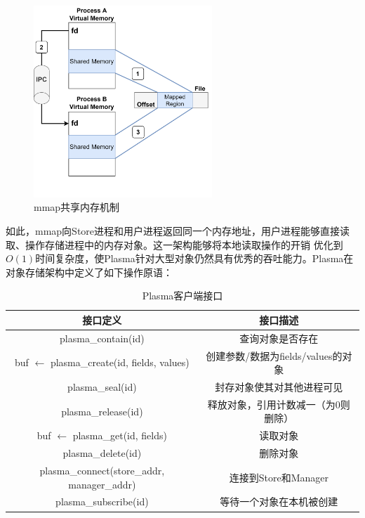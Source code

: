 \begin{figure}[h]
    \centering
    \includegraphics[width=0.6\textwidth]{image/chap02/mmap.png}
    \caption{mmap共享内存机制}
    \label{fig:mmap}
\end{figure}

如此，mmap向Store进程和用户进程返回同一个内存地址，用户进程能够直接读取、操作存储进程中的内存对象。这一架构能够将本地读取操作的开销
优化到$O(1)$时间复杂度，使Plasma针对大型对象仍然具有优秀的吞吐能力。Plasma在对象存储架构中定义了如下操作原语：

\begin{table}[h]
    \centering
    \caption{Plasma客户端接口}
    \begin{tabular}{*{2}{c}}
        \toprule
        接口定义 & 接口描述      \\
        \midrule
        plasma\_contain(id)                                    & 查询对象是否存在   \\
        buf $\leftarrow$ plasma\_create(id, fields, values)    & 创建参数/数据为fields/values的对象   \\
        plasma\_seal(id)                                       & 封存对象使其对其他进程可见   \\
        plasma\_release(id)                                    & 释放对象，引用计数减一（为0则删除）   \\
        buf $\leftarrow$ plasma\_get(id, fields)               & 读取对象   \\
        plasma\_delete(id)                                     & 删除对象   \\
        \midrule
        plasma\_connect(store\_addr, manager\_addr)            & 连接到Store和Manager \\
        plasma\_subscribe(id)                                  & 等待一个对象在本机被创建 \\ 
        \bottomrule
    \end{tabular}
    \label{tab:store_api}
\end{table}

